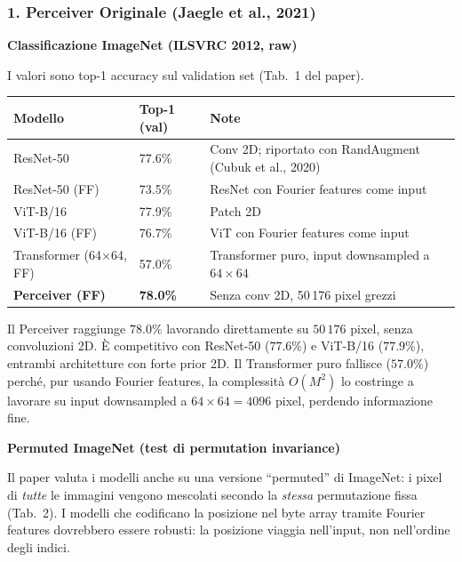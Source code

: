 \documentclass[
  11pt,
]{article}
\begin{document}
\subsubsection*{1. Perceiver Originale (Jaegle et al., 2021)}

\textbf{Classificazione ImageNet (ILSVRC 2012, raw)}

I valori sono top-1 accuracy sul validation set (Tab.\ 1 del paper).

{\small
\begin{longtable}{@{}p{5.5cm} p{2.5cm} p{5cm}@{}}
\toprule
\textbf{Modello} & \textbf{Top-1 (val)} & \textbf{Note} \\
\midrule
\endhead
ResNet-50 & 77.6\% & Conv 2D; riportato con RandAugment (Cubuk et al., 2020) \\[2pt]
ResNet-50 (FF) & 73.5\% & ResNet con Fourier features come input \\[2pt]
ViT-B/16 & 77.9\% & Patch 2D \\[2pt]
ViT-B/16 (FF) & 76.7\% & ViT con Fourier features come input \\[2pt]
Transformer (64$\times$64, FF) & 57.0\% & Transformer puro, input downsampled a $64\times64$ \\[2pt]
\textbf{Perceiver (FF)} & \textbf{78.0\%} & Senza conv 2D, 50\,176 pixel grezzi \\
\bottomrule
\end{longtable}
}

\begin{notabox}[title={\textbf{Perceiver su ImageNet raw}}]
Il Perceiver raggiunge $78.0\%$ lavorando direttamente su $50\,176$ pixel, senza convoluzioni 2D. È competitivo con ResNet-50 ($77.6\%$) e ViT-B/16 ($77.9\%$), entrambi architetture con forte prior 2D. Il Transformer puro fallisce ($57.0\%$) perché, pur usando Fourier features, la complessità $O(M^2)$ lo costringe a lavorare su input downsampled a $64\times64 = 4096$ pixel, perdendo informazione fine.
\end{notabox}

\textbf{Permuted ImageNet (test di permutation invariance)}

Il paper valuta i modelli anche su una versione ``permuted'' di ImageNet: i pixel di \emph{tutte} le immagini vengono mescolati secondo la \emph{stessa} permutazione fissa (Tab.\ 2). I modelli che codificano la posizione nel byte array tramite Fourier features dovrebbero essere robusti: la posizione viaggia nell'input, non nell'ordine degli indici.
\end{document}
